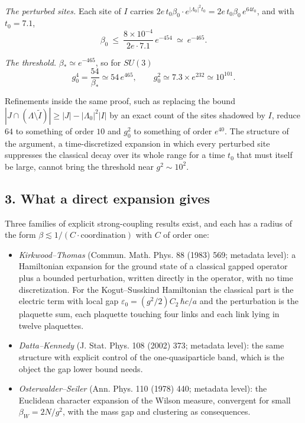 \documentclass[11pt,a4paper]{article}
\newcommand{\tightlist}{\setlength{\itemsep}{0pt}\setlength{\parskip}{0pt}}
\begin{document}
\emph{The perturbed sites.} Each site of \(I\) carries
\(2e\,t_0\beta_0\cdot e^{|\Lambda_0|^2t_0}=2e\,t_0\beta_0\,e^{64t_0}\),
and with \(t_0=7.1\),
\[\beta_0\ \le\ \frac{8\times10^{-4}}{2e\cdot7.1}\,e^{-454}\ \simeq\ e^{-465}.\]

\emph{The threshold.} \(\beta_*\simeq e^{-465}\), so for \(SU(3)\)
\[g_0^4=\frac{54}{\beta_*}\simeq54\,e^{465},\qquad g_0^2\simeq7.3\times e^{232}\simeq10^{101}.\]

Refinements inside the same proof, such as replacing the bound
\(|J\cap(\Lambda\setminus\tilde I)|\ge|J|-|\Lambda_0|^2|I|\) by an exact
count of the sites shadowed by \(I\), reduce \(64\) to something of
order \(10\) and \(g_0^2\) to something of order \(e^{40}\). The
structure of the argument, a time-discretized expansion in which every
perturbed site suppresses the classical decay over its whole range for a
time \(t_0\) that must itself be large, cannot bring the threshold near
\(g^2\sim10^2\).

\hypertarget{what-a-direct-expansion-gives}{%
\subsection{3. What a direct expansion
gives}\label{what-a-direct-expansion-gives}}

Three families of explicit strong-coupling results exist, and each has a
radius of the form \(\beta\lesssim1/(C\cdot\text{coordination})\) with
\(C\) of order one:

\begin{itemize}
\tightlist
\item
  \emph{Kirkwood--Thomas} (Commun. Math. Phys. 88 (1983) 569; metadata
  level): a Hamiltonian expansion for the ground state of a classical
  gapped operator plus a bounded perturbation, written directly in the
  operator, with no time discretization. For the Kogut--Susskind
  Hamiltonian the classical part is the electric term with local gap
  \(\varepsilon_0=(g^2/2)C_2\,\hbar c/a\) and the perturbation is the
  plaquette sum, each plaquette touching four links and each link lying
  in twelve plaquettes.
\item
  \emph{Datta--Kennedy} (J. Stat. Phys. 108 (2002) 373; metadata level):
  the same structure with explicit control of the one-quasiparticle
  band, which is the object the gap lower bound needs.
\item
  \emph{Osterwalder--Seiler} (Ann. Phys. 110 (1978) 440; metadata
  level): the Euclidean character expansion of the Wilson measure,
  convergent for small \(\beta_W=2N/g^2\), with the mass gap and
  clustering as consequences.
\end{itemize}
\end{document}
